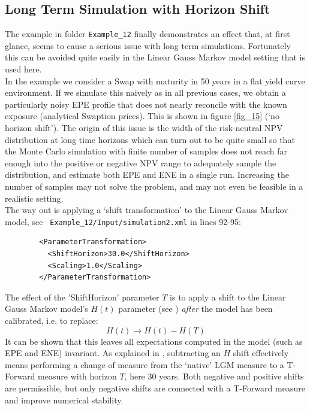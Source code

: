 \subsection{Long Term Simulation with Horizon Shift}\label{sec:longterm}

The example in folder {\tt Example\_12} finally demonstrates an effect that, at first glance, seems to cause a serious
issue with long term simulations. Fortunately this can be avoided quite easily in the Linear Gauss Markov model setting
that is used here. \\

In the example we consider a Swap with maturity in 50 years in a flat yield curve environment. If we simulate this
naively as in all previous cases, we obtain a particularly noisy EPE profile that does not nearly reconcile with the
known exposure (analytical Swaption prices). This is shown in figure \ref{fig_15} (`no horizon shift'). The origin of
this issue is the width of the risk-neutral NPV distribution at long time horizons which can turn out to be quite small
so that the Monte Carlo simulation with finite number of samples does not reach far enough into the positive or negative
NPV range to adequately sample the distribution, and estimate both EPE and ENE in a single run.  Increasing the number
of samples may not solve the problem, and may not even be feasible in a realistic setting. \\

The way out is applying a `shift transformation' to the Linear Gauss Markov model, see {\tt
  Example\_12/Input/simulation2.xml} in lines 92-95:
\begin{listing}[H]
\begin{verbatim}
        <ParameterTransformation>
          <ShiftHorizon>30.0</ShiftHorizon>
          <Scaling>1.0</Scaling>
        </ParameterTransformation>
\end{verbatim}
\end{listing}

The effect of the 'ShiftHorizon' parameter $T$ is to apply a shift to the Linear Gauss Markov model's $H(t)$ parameter
(see \cite{methods}) {\em after} the model has been calibrated, i.e. to replace:
$$
H(t) \rightarrow H(t) - H(T)
$$
It can be shown that this leaves all expectations computed in the model (such as EPE and ENE) invariant. As explained in
\cite{Lichters}, subtracting an $H$ shift effectively means performing a change of measure from the `native' LGM measure
to a T-Forward measure with horizon $T$, here 30 years. Both negative and positive shifts are permissible, but only
negative shifts are connected with a T-Forward measure and improve numerical stability. \\

